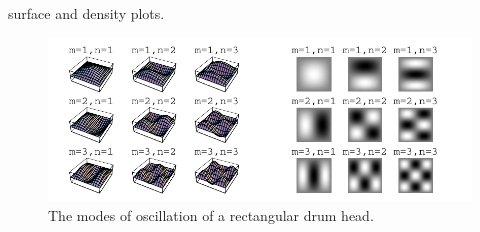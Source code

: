 {\begin{Solution}
  surface and density plots.
  \begin{figure}[h!]
    \begin{center}
      \includegraphics[width=\textwidth]{pde/separation/sinmx_sinny}
    \end{center}
    \caption{The modes of oscillation of a rectangular drum head.}
    \label{sinmx_sinny}
  \end{figure}
\end{Solution}









}
